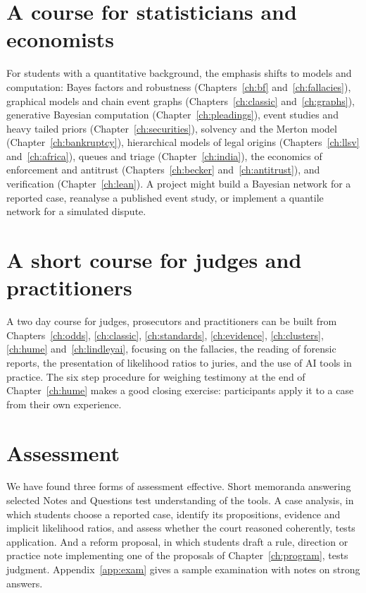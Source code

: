 \section{A course for statisticians and economists}

For students with a quantitative background, the emphasis shifts to models and computation: Bayes factors and robustness (Chapters~\ref{ch:bf} and~\ref{ch:fallacies}), graphical models and chain event graphs (Chapters~\ref{ch:classic} and~\ref{ch:graphs}), generative Bayesian computation (Chapter~\ref{ch:pleadings}), event studies and heavy tailed priors (Chapter~\ref{ch:securities}), solvency and the Merton model (Chapter~\ref{ch:bankruptcy}), hierarchical models of legal origins (Chapters~\ref{ch:llsv} and~\ref{ch:africa}), queues and triage (Chapter~\ref{ch:india}), the economics of enforcement and antitrust (Chapters~\ref{ch:becker} and~\ref{ch:antitrust}), and verification (Chapter~\ref{ch:lean}). A project might build a Bayesian network for a reported case, reanalyse a published event study, or implement a quantile network for a simulated dispute.

\section{A short course for judges and practitioners}

A two day course for judges, prosecutors and practitioners can be built from Chapters~\ref{ch:odds}, \ref{ch:classic}, \ref{ch:standards}, \ref{ch:evidence}, \ref{ch:clusters}, \ref{ch:hume} and~\ref{ch:lindleyai}, focusing on the fallacies, the reading of forensic reports, the presentation of likelihood ratios to juries, and the use of AI tools in practice. The six step procedure for weighing testimony at the end of Chapter~\ref{ch:hume} makes a good closing exercise: participants apply it to a case from their own experience.

\section{Assessment}

We have found three forms of assessment effective. Short memoranda answering selected Notes and Questions test understanding of the tools. A case analysis, in which students choose a reported case, identify its propositions, evidence and implicit likelihood ratios, and assess whether the court reasoned coherently, tests application. And a reform proposal, in which students draft a rule, direction or practice note implementing one of the proposals of Chapter~\ref{ch:program}, tests judgment. Appendix~\ref{app:exam} gives a sample examination with notes on strong answers.

